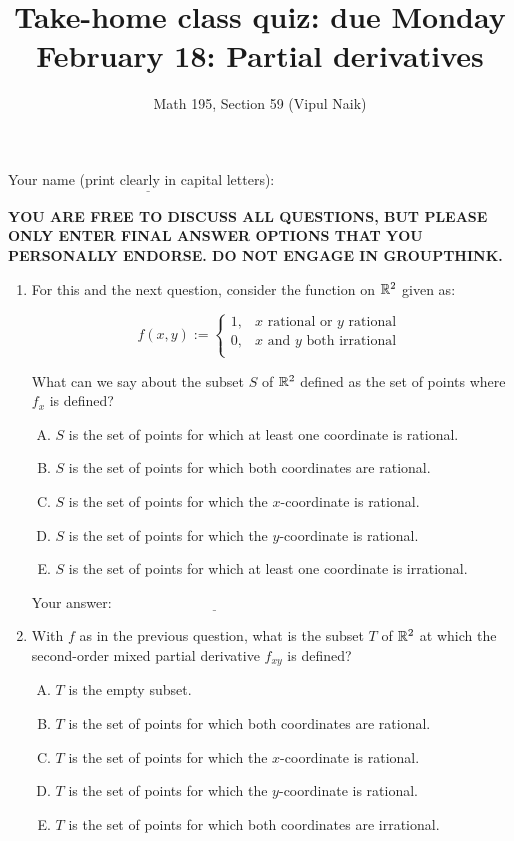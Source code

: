 \documentclass[10pt]{amsart}
\title{Take-home class quiz: due Monday February 18: Partial derivatives}
\author{Math 195, Section 59 (Vipul Naik)}
\begin{document}
\maketitle

Your name (print clearly in capital letters): $\underline{\qquad\qquad\qquad\qquad\qquad\qquad\qquad\qquad\qquad\qquad}$

{\bf YOU ARE FREE TO DISCUSS ALL QUESTIONS, BUT PLEASE ONLY ENTER
FINAL ANSWER OPTIONS THAT YOU PERSONALLY ENDORSE. DO NOT ENGAGE IN
GROUPTHINK.}

\begin{enumerate}

\item For this and the next question, consider the function on $\mathbb{R}^2$
  given as:

  $$f(x,y) := \left\lbrace \begin{array}{rl} 1, & x \text{ rational  or } y \text { rational }\\0, & x \text{ and } y \text{ both irrational } \\\end{array}\right.$$

  What can we say about the subset $S$ of $\mathbb{R}^2$ defined as the set of
  points where $f_x$ is defined?

  \begin{enumerate}[(A)]
  \item $S$ is the set of points for which at least one coordinate is rational.
  \item $S$ is the set of points for which both coordinates are rational.
  \item $S$ is the set of points for which the $x$-coordinate is rational.
  \item $S$ is the set of points for which the $y$-coordinate is rational.
  \item $S$ is the set of points for which at least one coordinate is
    irrational.
  \end{enumerate}

  \vspace{0.05in}
  Your answer: $\underline{\qquad\qquad\qquad\qquad\qquad\qquad\qquad}$
  \vspace{0.05in}

\item With $f$ as in the previous question, what is the subset $T$ of
  $\mathbb{R}^2$ at which the second-order mixed partial derivative $f_{xy}$
  is defined?
  
  \begin{enumerate}[(A)]
  \item $T$ is the empty subset.
  \item $T$ is the set of points for which both coordinates are rational.
  \item $T$ is the set of points for which the $x$-coordinate is rational.
  \item $T$ is the set of points for which the $y$-coordinate is rational.
  \item $T$ is the set of points for which both coordinates are
    irrational.
  \end{enumerate}


\end{enumerate}
\end{document}
